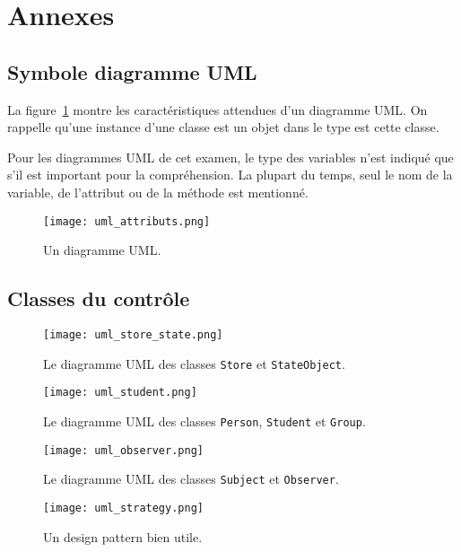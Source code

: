\documentclass[12pt]{article}
\begin{document}
\newpage
\section*{Annexes}

\subsection*{Symbole diagramme UML}

La figure~\ref{fig:UmlDiag} montre les caractéristiques attendues d'un diagramme UML. On rappelle qu'une instance d'une classe est un objet dans le type est cette classe.

Pour les diagrammes UML de cet examen, le type des variables n'est indiqué que s'il est important pour la compréhension. La plupart du temps, seul le nom de la variable, de l'attribut ou de la méthode est mentionné.


\begin{figure}[!h]
    \centering
    \texttt{[image: uml\_attributs.png]}        

    \caption{Un diagramme UML.\label{fig:UmlDiag}}
\end{figure}


\subsection*{Classes du contrôle}


\begin{figure}[!h]
    \centering
    \texttt{[image: uml\_store\_state.png]}        

    \cprotect\caption{Le diagramme UML des classes \verb|Store| et \verb|StateObject|.\label{fig:store_uml}}
\end{figure}


\begin{figure}[!h]
    \centering
    \texttt{[image: uml\_student.png]}        

    \cprotect\caption{Le diagramme UML des classes \verb|Person|, \verb|Student| et \verb|Group|.\label{fig:student_uml}}
\end{figure}


\begin{figure}[!h]
    \centering
    \texttt{[image: uml\_observer.png]}        

    \cprotect\caption{Le diagramme UML des classes \verb|Subject| et \verb|Observer|.\label{fig:observer_uml}}
\end{figure}



\begin{figure}[!h]
    \centering
    \texttt{[image: uml\_strategy.png]}        

    \cprotect\caption{Un design pattern bien utile.\label{fig:strategy_uml}}
\end{figure}
\end{document}

